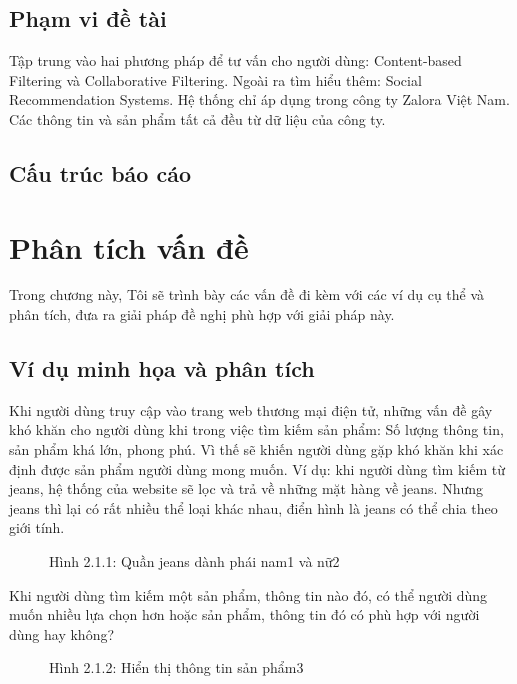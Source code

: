 \documentclass[a4paper,12pt,numbered,print,index,custombib, oneside, custommargin]{report}
\begin{document}
\section{Phạm vi đề tài}
Tập trung vào hai phương pháp để tư vấn cho người dùng: Content-based Filtering và Collaborative Filtering.
Ngoài ra tìm hiểu thêm: Social Recommendation Systems. 
Hệ thống chỉ áp dụng trong công ty Zalora Việt Nam.
Các thông tin và sản phẩm tất cả đều từ dữ liệu của công ty.

\section{Cấu trúc báo cáo}

%
%

\chapter{Phân tích vấn đề}

Trong chương này, Tôi sẽ trình bày các vấn đề đi kèm với các ví dụ cụ thể và phân tích, đưa ra giải pháp đề nghị phù hợp với giải pháp này.

\section{Ví dụ minh họa và phân tích}
Khi người dùng truy cập vào trang web thương mại điện tử, những vấn đề gây khó khăn cho người dùng khi trong việc tìm kiếm sản phẩm:
Số lượng thông tin, sản phẩm khá lớn, phong phú. Vì thế sẽ khiến người dùng gặp khó khăn khi xác định được sản phẩm người dùng mong muốn. Ví dụ: khi người dùng tìm kiếm từ jeans, hệ thống của website sẽ lọc và trả về những mặt hàng về jeans. Nhưng jeans thì lại có rất nhiều thể loại khác nhau, điển hình là jeans có thể chia theo giới tính.
\begin{figure}[h]
\centering
\caption{Hình 2.1.1: Quần jeans dành phái nam1 và nữ2}
\end{figure}

Khi người dùng tìm kiếm một sản phẩm, thông tin nào đó, có thể người dùng muốn nhiều lựa chọn hơn hoặc sản phẩm, thông tin đó có phù hợp với người dùng hay không?
\begin{figure}[h]
\centering
\caption{Hình 2.1.2: Hiển thị thông tin sản phẩm3}
\end{figure}
\end{document}
